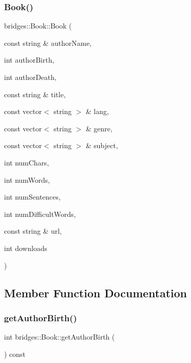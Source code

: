 \subsubsection{\texorpdfstring{Book()}{Book()}\hspace{0.1cm}{\footnotesize\ttfamily [2/2]}}
{\footnotesize\ttfamily bridges\+::\+Book\+::\+Book (\begin{DoxyParamCaption}\item[{const string \&}]{author\+Name,  }\item[{int}]{author\+Birth,  }\item[{int}]{author\+Death,  }\item[{const string \&}]{title,  }\item[{const vector$<$ string $>$ \&}]{lang,  }\item[{const vector$<$ string $>$ \&}]{genre,  }\item[{const vector$<$ string $>$ \&}]{subject,  }\item[{int}]{num\+Chars,  }\item[{int}]{num\+Words,  }\item[{int}]{num\+Sentences,  }\item[{int}]{num\+Difficult\+Words,  }\item[{const string \&}]{url,  }\item[{int}]{downloads }\end{DoxyParamCaption})\hspace{0.3cm}{\ttfamily [inline]}}



\subsection{Member Function Documentation}
\mbox{\label{classbridges_1_1_book_ac2c02b94f40eaddc7a2cca3f90976093}} 
\subsubsection{\texorpdfstring{getAuthorBirth()}{getAuthorBirth()}}
{\footnotesize\ttfamily int bridges\+::\+Book\+::get\+Author\+Birth (\begin{DoxyParamCaption}{ }\end{DoxyParamCaption}) const\hspace{0.3cm}{\ttfamily [inline]}}

